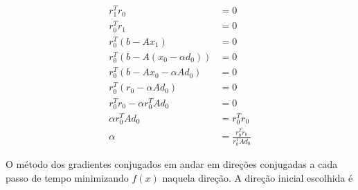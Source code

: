 \begin{align}
     r_1^T r_0                         & =  0 \\
     r_0^T r_1                         & =  0 \\
     r_0^T (b - Ax_1)                  & =  0 \\
     r_0^T (b - A(x_0 - \alpha d_0))   & =  0 \\
     r_0^T (b - Ax_0  - \alpha A d_0)  & =  0 \\
     r_0^T (r_0 - \alpha A d_0)        & =  0 \\
     r_0^T r_0 - \alpha  r_0^T A d_0   & =  0 \\
     \alpha  r_0^T A d_0               & =  r_0^T r_0 \\
     \alpha                            & =  \frac{r_0^T r_0}{r_0^T Ad_0}
\end{align}

O método dos gradientes conjugados em andar em direções conjugadas a cada passo de tempo minimizando $f(x)$ naquela direção. A direção inicial escolhida é